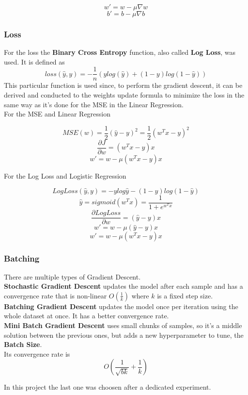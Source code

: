 \documentclass[
	letterpaper, %
	10pt, %
]{class}
\begin{document}
$$ w' = w - \mu \nabla w $$
$$ b' = b - \mu \nabla b $$

\subsubsection{Loss}
For the loss the \textbf{Binary Cross Entropy} \cite{binarycrossentropy} function, also called \textbf{Log Loss}, was used.
It is defined as
$$ loss(\hat{y}, y) = -\frac{1}{n}(y log(\hat{y}) + (1-y)log(1-\hat{y})) $$
This particular function is used since, to perform the gradient descent, it can be derived and conducted to the weights update formula to minimize the loss in the same way as it's done for the MSE \cite{mse} in the Linear Regression.\\

For the MSE and Linear Regression

$$ MSE(w) = \frac{1}{2} (\hat{y} - y)^2 = \frac{1}{2} (w^Tx - y)^2 $$
$$\frac{\partial J}{\partial w} = (w^T x - y)x $$
$$ w' = w - \mu (w^T x -y)x $$

For the Log Loss and Logistic Regression

$$ LogLoss(\hat{y}, y) = -y log \hat{y} - (1-y)log(1- \hat{y})$$
$$ \hat{y} = sigmoid(w^Tx) = \frac{1}{1 + e^{w^Tx}} $$
$$ \frac{\partial LogLoss}{\partial w} = (\hat{y} - y)x $$
$$ w' = w - \mu (\hat{y} - y)x $$
$$ w' = w - \mu (w^T x -y)x $$

\subsubsection{Batching}
There are multiple types of Gradient Descent.\\

\textbf{Stochastic Gradient Descent} updates the model after each sample and has a convergence rate that is non-linear $O(\frac{1}{k})$ where $k$ is a fixed step size.\\

\textbf{Batching Gradient Descent} updates the model once per iteration using the whole dataset at once. It has a better convergence rate.\\

\textbf{Mini Batch Gradient Descent} \cite{batching} uses small chunks of samples, so it's a middle solution between the previous ones, but adds a new hyperparameter to tune, the \textbf{Batch Size}.\\
Its convergence rate is
$$O(\frac{1}{\sqrt{bk}} + \frac{1}{k})$$

In this project the last one was choosen after a dedicated experiment.
\end{document}
